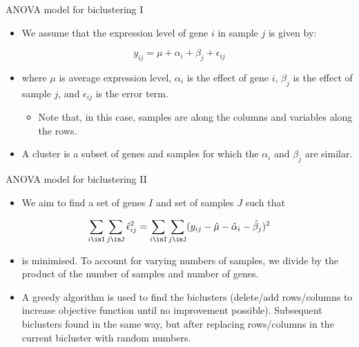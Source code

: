 \documentclass[
  ignorenonframetext,
  aspectratio=169,
]{beamer}
\providecommand{\tightlist}{%
  \setlength{\itemsep}{0pt}\setlength{\parskip}{0pt}}\usepackage{longtable,booktabs,array}
\begin{document}
\begin{frame}{ANOVA model for biclustering I}
\protect\hypertarget{anova-model-for-biclustering-i}{}
\begin{itemize}
\tightlist
\item
  We assume that the expression level of gene \(i\) in sample \(j\) is
  given by:
\end{itemize}

\[
y_{ij} = \mu + \alpha_i + \beta_j + \epsilon_{ij}
\]

\begin{itemize}
\tightlist
\item
  where \(\mu\) is average expression level, \(\alpha_i\) is the effect
  of gene \(i\), \(\beta_j\) is the effect of sample \(j\), and
  \(\epsilon_{ij}\) is the error term.

  \begin{itemize}
  \tightlist
  \item
    Note that, in this case, samples are along the columns and variables
    along the rows.
  \end{itemize}
\item
  A cluster is a subset of genes and samples for which the \(\alpha_i\)
  and \(\beta_j\) are similar.
\end{itemize}
\end{frame}

\begin{frame}{ANOVA model for biclustering II}
\protect\hypertarget{anova-model-for-biclustering-ii}{}
\begin{itemize}
\tightlist
\item
  We aim to find a set of genes \(I\) and set of samples \(J\) such that
\end{itemize}

\[
\sum_{i\inI}\sum_{j\inJ} \hat{\epsilon}_{ij}^2=\sum_{i\inI}\sum_{j\inJ} (y_{ij} - \hat{\mu} - \hat{\alpha}_i - \hat{\beta}_j)^2
\]

\begin{itemize}
\tightlist
\item
  is minimised. To account for varying numbers of samples, we divide by
  the product of the number of samples and number of genes.
\item
  A greedy algorithm is used to find the biclusters (delete/add
  rows/columns to increase objective function until no improvement
  possible). Subsequent biclusters found in the same way, but after
  replacing rows/columns in the current bicluster with random numbers.
\end{itemize}
\end{frame}
\end{document}
